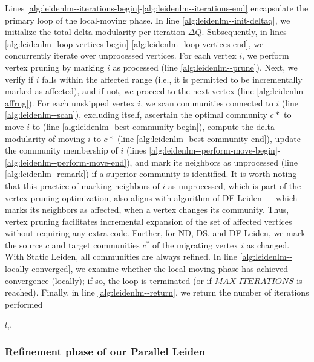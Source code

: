 Lines \ref{alg:leidenlm--iterations-begin}-\ref{alg:leidenlm--iterations-end} encapsulate the primary loop of the local-moving phase. In line \ref{alg:leidenlm--init-deltaq}, we initialize the total delta-modularity per iteration $\Delta Q$. Subsequently, in lines \ref{alg:leidenlm--loop-vertices-begin}-\ref{alg:leidenlm--loop-vertices-end}, we concurrently iterate over unprocessed vertices. For each vertex $i$, we perform vertex pruning by marking $i$ as processed (line \ref{alg:leidenlm--prune}). Next, we verify if $i$ falls within the affected range (i.e., it is permitted to be incrementally marked as affected), and if not, we proceed to the next vertex (line \ref{alg:leidenlm--affrng}). For each unskipped vertex $i$, we scan communities connected to $i$ (line \ref{alg:leidenlm--scan}), excluding itself, ascertain the optimal community $c*$ to move $i$ to (line \ref{alg:leidenlm--best-community-begin}), compute the delta-modularity of moving $i$ to $c*$ (line \ref{alg:leidenlm--best-community-end}), update the community membership of $i$ (lines \ref{alg:leidenlm--perform-move-begin}-\ref{alg:leidenlm--perform-move-end}), and mark its neighbors as unprocessed (line \ref{alg:leidenlm--remark}) if a superior community is identified. It is worth noting that this practice of marking neighbors of $i$ as unprocessed, which is part of the vertex pruning optimization, also aligns with algorithm of DF Leiden --- which marks its neighbors as affected, when a vertex changes its community. Thus, vertex pruning facilitates incremental expansion of the set of affected vertices without requiring any extra code. Further, for ND, DS, and DF Leiden, we mark the source $c$ and target communities $c^*$ of the migrating vertex $i$ as changed. With Static Leiden, all communities are always refined. In line \ref{alg:leidenlm--locally-converged}, we examine whether the local-moving phase has achieved convergence (locally); if so, the loop is terminated (or if $MAX\_ITERATIONS$ is reached). Finally, in line \ref{alg:leidenlm--return}, we return the number of iterations performed $l_i$.


\subsubsection{Refinement phase of our Parallel Leiden}



